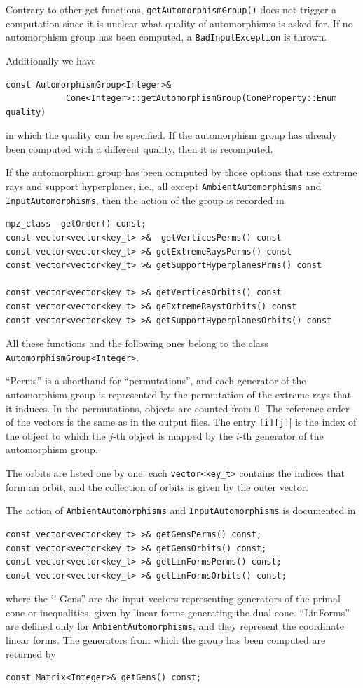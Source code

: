 \begin{small}
Contrary to other get functions, \verb|getAutomorphismGroup()| does not trigger a computation since it is unclear what quality of automorphisms is asked for. If no automorphism group has been computed, a \verb|BadInputException| is thrown.

Additionally we have
\begin{Verbatim}
const AutomorphismGroup<Integer>& 
            Cone<Integer>::getAutomorphismGroup(ConeProperty::Enum quality)
\end{Verbatim}
in which the quality can be specified. If the automorphism group has already been computed with a different quality, then it is recomputed.

If the automorphism group has been computed by those options that use extreme rays and support hyperplanes, i.e., all except \verb|AmbientAutomorphisms| and \verb|InputAutomorphisms|, then the action of the group is recorded in
\begin{Verbatim}
mpz_class  getOrder() const;
const vector<vector<key_t> >&  getVerticesPerms() const
const vector<vector<key_t> >& getExtremeRaysPerms() const
const vector<vector<key_t> >& getSupportHyperplanesPrms() const

const vector<vector<key_t> >& getVerticesOrbits() const
const vector<vector<key_t> >& geExtremeRaystOrbits() const
const vector<vector<key_t> >& getSupportHyperplanesOrbits() const
\end{Verbatim}
All these functions and the following ones belong to the class \verb|AutomorphismGroup<Integer>|.

``Perms'' is a shorthand for ``permutations'', and each generator of the automorphism group is represented by the permutation of the extreme rays that it induces. In the permutations, objects are counted from $0$. The reference order of the vectors is the same as in the output files. The entry \verb|[i][j]|| is the index of the object to which the $j$-th object is mapped by the $i$-th generator of the automorphism group.

The orbits are listed one by one: each \verb|vector<key_t>| contains the indices that form an orbit, and the collection of orbits is given by the outer vector.

The action  of \verb|AmbientAutomorphisms| and \verb|InputAutomorphisms| is documented in
\begin{Verbatim}
const vector<vector<key_t> >& getGensPerms() const;
const vector<vector<key_t> >& getGensOrbits() const;
const vector<vector<key_t> >& getLinFormsPerms() const;
const vector<vector<key_t> >& getLinFormsOrbits() const; 
\end{Verbatim}
where the `' Gens'' are the input vectors representing generators of the primal cone or inequalities, given by linear forms  generating the dual cone. ``LinForms'' are defined only for \verb|AmbientAutomorphisms|, and they represent the coordinate linear forms. The generators from which the group has been computed are returned by
\begin{Verbatim}
const Matrix<Integer>& getGens() const;
\end{Verbatim}


\end{small}
